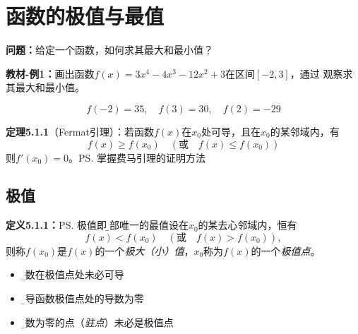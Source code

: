 \section{函数的极值与最值}

{\bf 问题：}给定一个函数，如何求其最大和最小值？

{\bf 教材-例1：}画出函数$f(x)=3x^4-4x^3-12x^2+3$在区间$[-2,3]$，通过
观察求其最大和最小值。

\begin{center}
\end{center}
\vspace{-2em}
$$f(-2)=35,\quad f(3)=30,\quad f(2)=-29$$

{\bf 定理5.1.1}（Fermat引理）：若函数$f(x)$在$x_0$处可导，且在$x_0$的某邻域内，有
$$f(x)\geq f(x_0)\quad (\mbox{或}\quad f(x)\leq f(x_0))$$
则$f'(x_0)=0$。\ps{掌握费马引理的证明方法}

\subsection{极值}

{\bf 定义5.1.1：}\ps{极值即{\b 局部唯一的最值}}设在$x_0$的某去心邻域内，恒有
$$f(x)<f(x_0)\quad (\mbox{或}\quad f(x)>f(x_0)),$$
则称$f(x_0)$是$f(x)$的一个{\it 极大（小）值}，$x_0$称为$f(x)$的一个{\it 极值点}。

\begin{itemize}
  \setlength{\itemindent}{1cm}
  \item {\b 函数在极值点处未必可导} 
  \item {\b 可导函数极值点处的导数为零} 
  \item {\b 导数为零的点（{\it 驻点}）未必是极值点}
\end{itemize}

